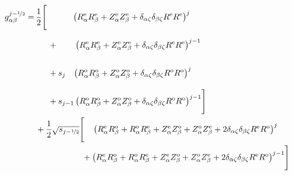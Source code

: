 \begin{align}
  g_{\alpha \beta}^{j-\half} =&\,          \frac{1}{2} \Biggl[    \phantom{+ s_{j-1}}~  \left(   R_\alpha^\mathrm{e} R_\beta^\mathrm{e} + Z_\alpha^\mathrm{e} Z_\beta^\mathrm{e}
                                                                                               + \delta_{\alpha \zeta} \delta_{\beta \zeta} R^\mathrm{e} R^\mathrm{e} \right)^j     \nonumber \\
                             ~&\, \phantom{\frac{1}{2} \Biggl[}\, + \phantom{s_{j-1}}   \left(   R_\alpha^\mathrm{e} R_\beta^\mathrm{e} + Z_\alpha^\mathrm{e} Z_\beta^\mathrm{e}
                                                                                               + \delta_{\alpha \zeta} \delta_{\beta \zeta} R^\mathrm{e} R^\mathrm{e} \right)^{j-1} \nonumber \\
                             ~&\, \phantom{\frac{1}{2} \Biggl[}\, +          s_j ~~\,   \left(   R_\alpha^\mathrm{o} R_\beta^\mathrm{o} + Z_\alpha^\mathrm{o} Z_\beta^\mathrm{o}
                                                                                               + \delta_{\alpha \zeta} \delta_{\beta \zeta} R^\mathrm{o} R^\mathrm{o} \right)^j     \nonumber \\
                             ~&\, \phantom{\frac{1}{2} \Biggl[}\, +          s_{j-1}    \left(   R_\alpha^\mathrm{o} R_\beta^\mathrm{o} + Z_\alpha^\mathrm{o} Z_\beta^\mathrm{o}
                                                                                               + \delta_{\alpha \zeta} \delta_{\beta \zeta} R^\mathrm{o} R^\mathrm{o} \right)^{j-1} \Biggr] \nonumber \\
                             ~&\,          + \frac{1}{2} \sqrt{s_{j-\half}} \Biggl[ \phantom{+}\, \left(   R_\alpha^\mathrm{e} R_\beta^\mathrm{o} + R_\alpha^\mathrm{o} R_\beta^\mathrm{e}
                                                                                                         + Z_\alpha^\mathrm{e} Z_\beta^\mathrm{o} + Z_\alpha^\mathrm{o} Z_\beta^\mathrm{e}
                                                                                                         + 2 \delta_{\alpha \zeta} \delta_{\beta \zeta} R^\mathrm{e} R^\mathrm{o} \right)^j \nonumber \\
                             ~&\, \phantom{+ \frac{1}{2} \sqrt{s_{j-\half}} \Biggl[}\,       +    \left(   R_\alpha^\mathrm{e} R_\beta^\mathrm{o} + R_\alpha^\mathrm{o} R_\beta^\mathrm{e}
                                                                                                         + Z_\alpha^\mathrm{e} Z_\beta^\mathrm{o} + Z_\alpha^\mathrm{o} Z_\beta^\mathrm{e}
                                                                                                         + 2 \delta_{\alpha \zeta} \delta_{\beta \zeta} R^\mathrm{e} R^\mathrm{o} \right)^{j-1} \Biggr]
\end{align}
